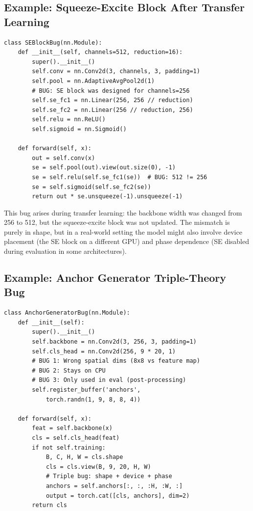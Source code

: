 \documentclass[10pt]{article}
\theoremstyle{plain}
\theoremstyle{definition}
\theoremstyle{remark}
\begin{document}
\subsection{Example: Squeeze-Excite Block After Transfer Learning}

\begin{lstlisting}[caption={Squeeze-excite channel mismatch after
  changing backbone width.  Modeled after timm patterns.},
  label={lst:se}]
class SEBlockBug(nn.Module):
    def __init__(self, channels=512, reduction=16):
        super().__init__()
        self.conv = nn.Conv2d(3, channels, 3, padding=1)
        self.pool = nn.AdaptiveAvgPool2d(1)
        # BUG: SE block was designed for channels=256
        self.se_fc1 = nn.Linear(256, 256 // reduction)
        self.se_fc2 = nn.Linear(256 // reduction, 256)
        self.relu = nn.ReLU()
        self.sigmoid = nn.Sigmoid()

    def forward(self, x):
        out = self.conv(x)
        se = self.pool(out).view(out.size(0), -1)
        se = self.relu(self.se_fc1(se))  # BUG: 512 != 256
        se = self.sigmoid(self.se_fc2(se))
        return out * se.unsqueeze(-1).unsqueeze(-1)
\end{lstlisting}

This bug arises during transfer learning: the backbone width was
changed from 256 to 512, but the squeeze-excite block was not
updated.  The mismatch is purely in shape, but in a real-world
setting the model might also involve device placement (the SE block
on a different GPU) and phase dependence (SE disabled during
evaluation in some architectures).

\subsection{Example: Anchor Generator Triple-Theory Bug}

\begin{lstlisting}[caption={Anchor generator with three simultaneous
  property violations.  Modeled after mmdetection patterns.},
  label={lst:anchor}]
class AnchorGeneratorBug(nn.Module):
    def __init__(self):
        super().__init__()
        self.backbone = nn.Conv2d(3, 256, 3, padding=1)
        self.cls_head = nn.Conv2d(256, 9 * 20, 1)
        # BUG 1: Wrong spatial dims (8x8 vs feature map)
        # BUG 2: Stays on CPU
        # BUG 3: Only used in eval (post-processing)
        self.register_buffer('anchors',
            torch.randn(1, 9, 8, 8, 4))

    def forward(self, x):
        feat = self.backbone(x)
        cls = self.cls_head(feat)
        if not self.training:
            B, C, H, W = cls.shape
            cls = cls.view(B, 9, 20, H, W)
            # Triple bug: shape + device + phase
            anchors = self.anchors[:, :, :H, :W, :]
            output = torch.cat([cls, anchors], dim=2)
        return cls
\end{lstlisting}
\end{document}

